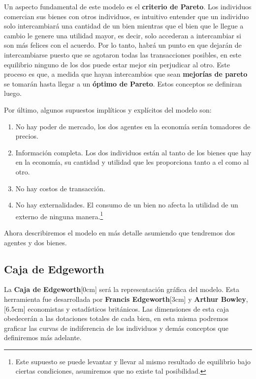 Un aspecto fundamental de este modelo es el \textbf{criterio de Pareto}. Los individuos comercian sus bienes con otros individuos, es intuitivo entender que un individuo solo intercambiará una cantidad de un bien mientras que el bien que le llegue a cambio le genere una utilidad mayor, es decir, solo accederan a intercambiar si son más felices con el acuerdo. Por lo tanto, habrá un punto en que dejarán de intercambiarse puesto que se agotaron todas las transacciones posibles, en este equilibrio ninguno de los dos puede estar mejor sin perjudicar al otro. Este proceso es que, a medida que hayan intercambios que sean \textbf{mejorías de pareto} se tomarán hasta llegar a un \textbf{óptimo de Pareto}. Estos conceptos se definiran luego.

Por último, algunos supuestos implíticos y explícitos del modelo son:
\begin{enumerate}
    \item No hay poder de mercado, los dos agentes en la economía serán tomadores de precios. 
    \item Información completa. Los dos individuos están al tanto de los bienes que hay en la economía, su cantidad y utilidad que les proporciona tanto a el como al otro. 
    \item No hay costos de transacción. 
    \item No hay externalidades. El consumo de un bien no afecta la utilidad de un externo de ninguna manera.\footnote{Este supuesto se puede levantar y llevar al mismo resultado de equilibrio bajo ciertas condiciones, asumiremos que no existe tal posibilidad.} 
\end{enumerate}

Ahora describiremos el modelo en más detalle asumiendo que tendremos dos agentes y dos bienes. 

\subsection{Caja de Edgeworth}

La \textbf{Caja de Edgeworth}[0cm] será la representación gráfica del modelo. Esta herramienta fue desarrollada por \textbf{Francis Edgeworth}[3cm] y \textbf{Arthur Bowley},[6.5cm] economistas y estadísticos británicos. Las dimensiones de esta caja obedecerán a las dotaciones totales de cada bien, en esta misma podremos graficar las curvas de indiferencia de los individuos y demás conceptos que definiremos más adelante. 

